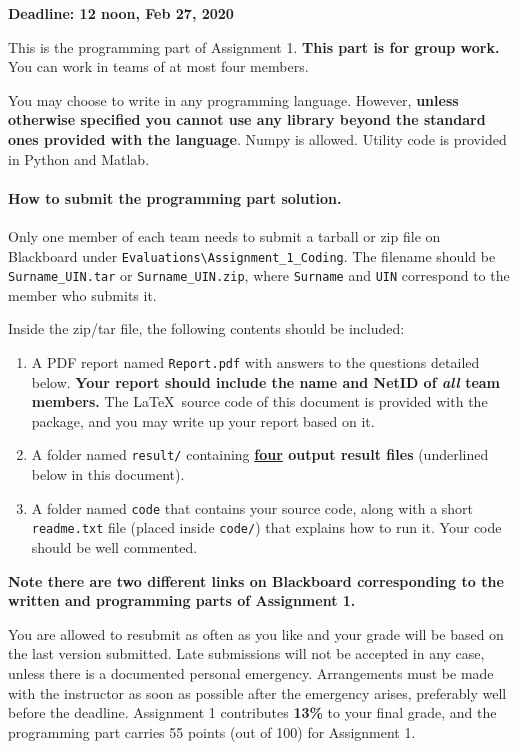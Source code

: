 \documentclass[11pt]{report}
\begin{document}
\maketitle

{\bf Deadline: 12 noon, Feb 27, 2020}

This is the programming part of Assignment 1.
{\bf This part is for group work.}
You can work in teams of at most four members.


You may choose to write in any programming language.
However, {\bf unless otherwise specified you cannot use any library beyond the standard ones provided with the language}.
Numpy is allowed.
Utility code is provided in Python and Matlab.


\paragraph{How to submit the programming part solution.}

Only one member of each team needs to submit a tarball or zip file on Blackboard
under \verb#Evaluations\Assignment_1_Coding#.
The filename should be \verb#Surname_UIN.tar# or \verb#Surname_UIN.zip#,
where \verb#Surname# and \verb#UIN# correspond to the member who submits it.

Inside the zip/tar file, the following contents should be included:
\begin{enumerate}
	\item  A PDF report named \verb#Report.pdf# with answers to the questions detailed below.
	{\bf Your report should include the name and NetID of \emph{all} team members.}
	The \LaTeX\ source code of this document is provided with the package, and you may write up your report based on it.
	\item A folder named \verb#result/# containing {\bf \underline{four} output result files} (underlined below in this document).
	\item A folder named \verb#code# that contains your source code, along with a short \verb#readme.txt# file (placed inside \verb#code/#) that explains how to run it.
		Your code should be well commented.
\end{enumerate}


{\bf Note there are two different links on Blackboard corresponding to the written and programming parts of Assignment 1.}


You are allowed to resubmit as often as you like and your grade will be based on the last version submitted.
Late submissions will not be accepted in any case, 
unless there is a documented personal emergency.  
Arrangements must be made with the instructor as soon as possible after the emergency arises,
preferably well before the deadline.
Assignment 1 contributes {\bf 13\%} to your final grade,
and the programming part carries 55 points (out of 100) for Assignment 1.
\end{document}
